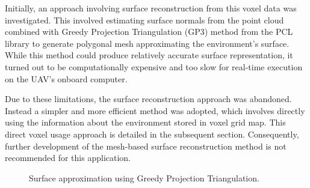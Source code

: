             Initially, an approach involving surface reconstruction from this voxel data was investigated. 
            This involved estimating surface normals from the point cloud combined with Greedy Projection Triangulation (GP3) method from the PCL library to generate polygonal mesh approximating the environment's surface.
            While this method could produce relatively accurate surface representation, it turned out to be computationally expensive and too slow for real-time execution on the \ac{UAV}'s onboard computer.

            Due to these limitations, the surface reconstruction approach was abandoned. 
            Instead a simpler and more efficient method was adopted, which involves directly using the information about the environment stored in voxel grid map.
            This direct voxel usage approach is detailed in the subsequent section. 
            Consequently, further development of the mesh-based surface reconstruction method is not recommended for this application.

            \begin{figure}[H]
                \centering
                \caption{
                    Surface approximation using Greedy Projection Triangulation.
                }
                \label{fig:triangulation}
            \end{figure}

